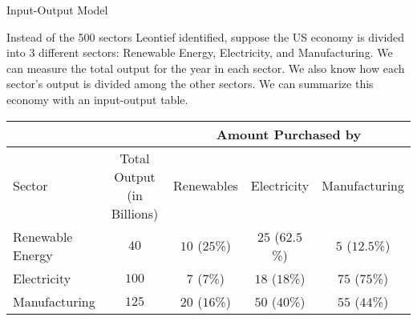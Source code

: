 \documentclass[xcolor=dvipsnames, aspectratio=169]{beamer}
\begin{document}
\begin{frame}{Input-Output Model}

  \bi
  \ii Instead of the 500 sectors Leontief identified, suppose the US economy is divided into 3 different sectors: Renewable Energy, Electricity, and Manufacturing.
  \pause
  \ii We can measure the total output for the year in each sector.
  \pause
 \ii We also know how each sector's output is divided among the other sectors.
  \pause
\ii We can summarize this economy with an \alert{input-output table}.
  \pause
  \ei

  \begin{center}
  \begin{tabular}{|l|c||c|c|c|}
    \hline
    &  & \multicolumn{3}{|c|}{Amount Purchased by } \\
    \hline
    Sector & Total Output (in Billions) & Renewables & Electricity & Manufacturing \\
    \hline
    Renewable Energy & $40$ & $10$ ($25$\%) & $25$ ($62.5$\%) & $5$ ($12.5$\%) \\ 
    \hline
   Electricity & $100$ & $7$ ($7$\%) & $18$ ($18$\%) & $75$ ($75$\%) \\
    \hline
    Manufacturing & $125$ & $20$ ($16$\%) & $50$ ($40$\%) & $55$ ($44$\%)\\
    \hline
 \end{tabular} 
  \end{center}
  
  \end{frame}
\end{document}
